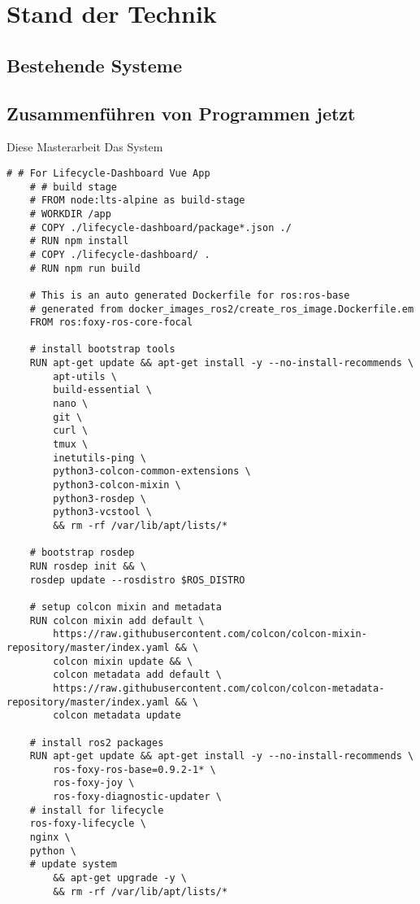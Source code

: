 \chapter{Stand der Technik}
\label{StandDerTechnik}
	\section{Bestehende Systeme}
	\label{StandDerTechnik:Sub1}
	
	\section{Zusammenführen von Programmen jetzt}
	\label{StandDerTechnik:Sub2}
	Diese Masterarbeit 
	Das System \cite{Laura}

	
\begin{lstlisting}[language=docker,
	caption={Dockerfile}, 
	label={code:DockerTestumgebung}]
	# # For Lifecycle-Dashboard Vue App
	# # build stage
	# FROM node:lts-alpine as build-stage
	# WORKDIR /app
	# COPY ./lifecycle-dashboard/package*.json ./
	# RUN npm install
	# COPY ./lifecycle-dashboard/ .
	# RUN npm run build

	# This is an auto generated Dockerfile for ros:ros-base
	# generated from docker_images_ros2/create_ros_image.Dockerfile.em
	FROM ros:foxy-ros-core-focal

	# install bootstrap tools
	RUN apt-get update && apt-get install -y --no-install-recommends \
		apt-utils \
		build-essential \
		nano \
		git \
		curl \
		tmux \
		inetutils-ping \
		python3-colcon-common-extensions \
		python3-colcon-mixin \
		python3-rosdep \
		python3-vcstool \
		&& rm -rf /var/lib/apt/lists/*

	# bootstrap rosdep
	RUN rosdep init && \
	rosdep update --rosdistro $ROS_DISTRO

	# setup colcon mixin and metadata
	RUN colcon mixin add default \
		https://raw.githubusercontent.com/colcon/colcon-mixin-repository/master/index.yaml && \
		colcon mixin update && \
		colcon metadata add default \
		https://raw.githubusercontent.com/colcon/colcon-metadata-repository/master/index.yaml && \
		colcon metadata update

	# install ros2 packages
	RUN apt-get update && apt-get install -y --no-install-recommends \
		ros-foxy-ros-base=0.9.2-1* \
		ros-foxy-joy \
		ros-foxy-diagnostic-updater \
	# install for lifecycle 
	ros-foxy-lifecycle \
	nginx \
	python \
	# update system
		&& apt-get upgrade -y \
		&& rm -rf /var/lib/apt/lists/* 


\end{lstlisting}
